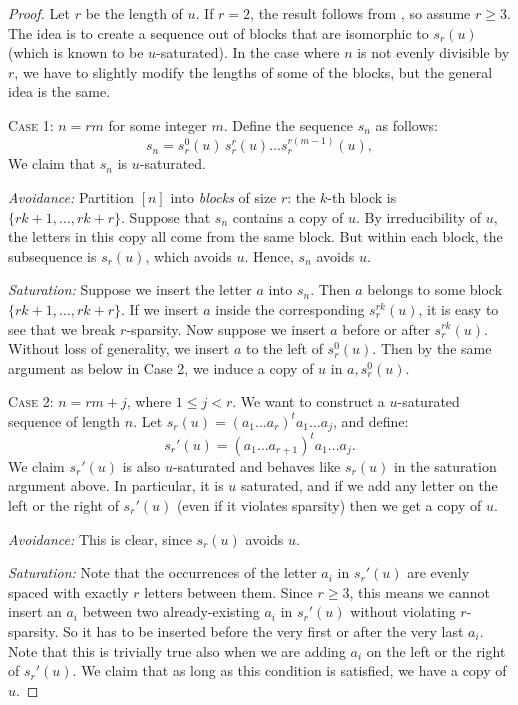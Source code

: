 \documentclass[12pt]{amsart}
\theoremstyle{definition}
\numberwithin{equation}{section}
\numberwithin{table}{thm}
\begin{document}
\begin{proof}  
Let $r$ be the length of $u$. If $r = 2$, the result follows from \cite{ANAND2025382}, so assume $r \ge 3$. The idea is to create a sequence out of blocks that are isomorphic to $s_r(u)$ (which is known to be $u$-saturated). In the case where $n$ is not evenly divisible by $r$, we have to slightly modify the lengths of some of the blocks, but the general idea is the same.

\vspace{2mm}\noindent
\textsc{Case 1:} $n = rm$ for some integer $m$.\newline
Define the sequence $s_n$ as follows:
\[s_n = s_r^0(u) \, s_r^r(u) \dots s_r^{r(m-1)}(u),\]
We claim that $s_n$ is $u$-saturated.

\textit{Avoidance:} Partition $[n]$ into \textit{blocks} of size $r$: the $k$-th block is $\{rk+1, \dots, rk + r\}$. Suppose that $s_n$ contains a copy of $u$. By irreducibility of $u$, the letters in this copy all come from the same block. But within each block, the subsequence is $s_r(u)$, which avoids $u$. Hence, $s_n$ avoids $u$.

\textit{Saturation:} Suppose we insert the letter $a$ into $s_n$. Then $a$ belongs to some block $\{rk+1, \dots, rk+r\}$. If we insert $a$ inside the corresponding $s_r^{rk}(u)$, it is easy to see that we break $r$-sparsity. Now suppose we insert $a$ before or after $s_r^{rk}(u)$. Without loss of generality, we insert $a$ to the left of $s_r^0(u)$. Then by the same argument as below in Case 2, we induce a copy of $u$ in $a,s_r^0(u)$.


\vspace{2mm}\noindent
\textsc{Case 2:} ${n = rm + j}$, where ${1 \le j < r}$. \newline
We want to construct a $u$-saturated sequence of length $n$. Let $s_r(u) = (a_1 \dots a_r)^t a_1 \dots a_j$, and define:
\[s_r'(u) = (a_1 \dots a_{r+1})^t a_1 \dots a_j.\]
We claim $s_r'(u)$ is also $u$-saturated and behaves like $s_r(u)$ in the saturation argument above. In particular, it is $u$ saturated, and if we add any letter on the left or the right of $s_r'(u)$ (even if it violates sparsity) then we get a copy of $u$.

\textit{Avoidance:} This is clear, since $s_r(u)$ avoids $u$.

\textit{Saturation:} Note that the occurrences of the letter $a_i$ in $s_r'(u)$ are evenly spaced with exactly $r$ letters between them. Since $r\ge 3$, this means we cannot insert an $a_i$ between two already-existing $a_i$ in $s_r'(u)$ without violating $r$-sparsity. So it has to be inserted before the very first or after the very last $a_i$. Note that this is trivially true also when we are adding $a_i$ on the left or the right of $s_r'(u)$. We claim that as long as this condition is satisfied, we have a copy of $u$.
    

\end{proof}
\end{document}
